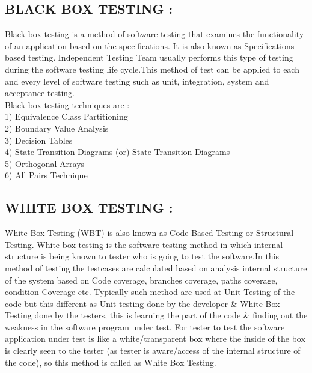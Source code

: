 \documentclass[10pt,a4paper]{article}
\begin{document}
\subsection{BLACK BOX TESTING : }
		 Black-box testing is a method of software testing that examines the functionality of an application based on the specifications. It is also known as Specifications based testing. Independent Testing Team usually performs this type of testing during the software testing life cycle.This method of test can be applied to each and every level of software testing such as unit, integration, system and acceptance testing.\\
		 Black box testing techniques are :\\
1) Equivalence Class Partitioning\\
2) Boundary Value Analysis\\
3) Decision Tables\\
4) State Transition Diagrams (or) State Transition Diagrams\\
5) Orthogonal Arrays\\
6) All Pairs Technique\\

\subsection{WHITE BOX TESTING :}
		 White Box Testing (WBT) is also known as Code-Based Testing or Structural Testing. White box testing is the software testing method in which internal structure is being known to tester who is going to test the software.In this method of testing the testcases are calculated based on analysis internal structure of the system based on Code coverage, branches coverage, paths coverage, condition Coverage etc. Typically such method are used at Unit Testing of the code but this different as Unit testing done by the developer \& White Box Testing done by the testers, this is learning the part of the code \& finding out the weakness in the software program under test.
For tester to test the software application under test is like a white/transparent box where the inside of the box is clearly seen to the tester (as tester is aware/access of the internal structure of the code), so this method is called as White Box Testing.
\end{document}
